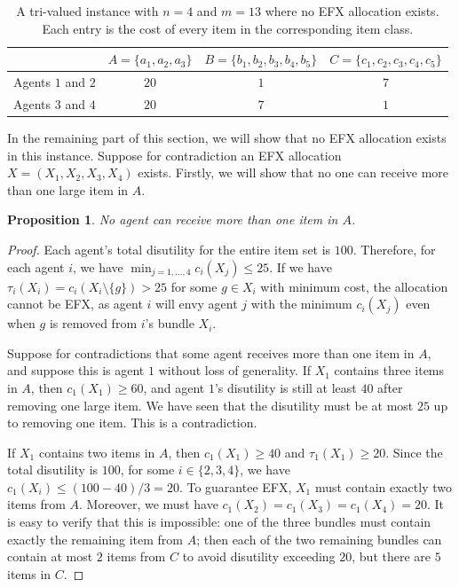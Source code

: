 \documentclass{article}
\newtheorem{proposition}{Proposition}
\theoremstyle{definition}
\begin{document}
\begin{table}[h]
    \centering
    \caption{A tri-valued instance with $n=4$ and $m=13$ where no EFX allocation exists.  Each entry is the cost of every item in the corresponding item class.}

    \begin{tabular}{cccc}
    \hline
         & $A=\{a_1,a_2,a_3\}$ & $B=\{b_1,b_2,b_3,b_4,b_5\}$ & $C=\{c_1,c_2,c_3,c_4,c_5\}$\\
    \hline
       Agents $1$ and $2$  & $20$ & $1$ & $7$\\
       Agents $3$ and $4$  & $20$ & $7$ & $1$\\
    \hline
    \end{tabular}
    
    \label{tab:tri}
\end{table}

In the remaining part of this section, we will show that no EFX allocation exists in this instance.
Suppose for contradiction an EFX allocation $X=(X_1,X_2,X_3,X_4)$ exists.
Firstly, we will show that no one can receive more than one large item in $A$.

\begin{proposition}
    No agent can receive more than one item in $A$.
\end{proposition}
\begin{proof}
    Each agent's total disutility for the entire item set is $100$. Therefore, for each agent $i$, we have $\min_{j=1,\ldots,4}c_i(X_j)\leq 25$.
    If we have $\tau_i(X_i)=c_i(X_i\setminus\{g\})>25$ for some $g\in X_i$ with minimum cost, the allocation cannot be EFX, as agent $i$ will envy agent $j$ with the minimum $c_i(X_j)$ even when $g$ is removed from $i$'s bundle $X_i$.

    Suppose for contradictions that some agent receives more than one item in $A$, and suppose this is agent $1$ without loss of generality.
    If $X_1$ contains three items in $A$, then $c_1(X_1)\geq 60$, and agent $1$'s disutility is still at least $40$ after removing one large item.
    We have seen that the disutility must be at most $25$ up to removing one item.
    This is a contradiction.

    If $X_1$ contains two items in $A$, then $c_1(X_1)\geq 40$ and $\tau_1(X_1)\geq20$.
    Since the total disutility is $100$, for some $i\in\{2,3,4\}$, we have $c_1(X_i)\leq (100-40)/3=20$.
    To guarantee EFX, $X_1$ must contain exactly two items from $A$.
    Moreover, we must have $c_1(X_2)=c_1(X_3)=c_1(X_4)=20$.
    It is easy to verify that this is impossible: one of the three bundles must contain exactly the remaining item from $A$; then each of the two remaining bundles can contain at most $2$ items from $C$ to avoid disutility exceeding $20$, but there are $5$ items in $C$.
\end{proof}
\end{document}

